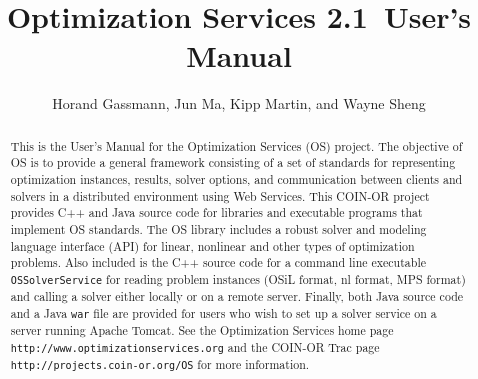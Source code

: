 \documentclass[11pt]{article}
\renewcommand{\_}{{\char"5F}}
\renewcommand{\{}{{\char"7B}}
\renewcommand{\}}{{\char"7D}}
\renewcommand{\^}{{\char"0D}}
\renewcommand{\'}{{\char"0D}}
\newcommand{\UrlOs}{http://www.optimizationservices.org}
\newcommand{\UrlTrac}{http://projects.coin-or.org/OS}
\newcommand{\OSstable}{2.1}
\begin{document}

\title{Optimization Services \OSstable\ User's Manual }
\vskip 2in
\author{Horand Gassmann, Jun Ma,  Kipp Martin, and Wayne Sheng}
\maketitle

\begin{abstract}
This is the User's Manual for the Optimization Services (OS) project.  The objective of OS is to provide a
general framework consisting of a set of standards for representing optimization instances, results,
solver options, and communication between clients and solvers in a distributed environment using Web Services.
This COIN-OR project provides C++ and Java source code for libraries and executable programs that 
implement OS standards.   The OS library includes a robust solver and modeling language interface (API) for linear,
nonlinear and other types of optimization problems.   Also included is the C++ source code for a  command line
executable {\tt OSSolverService}  for reading problem instances 
(OSiL format, nl format, MPS format) and
calling a solver either locally or on a remote server.  Finally,  both Java source code and a Java {\tt war} 
file are provided for users who wish to set up a solver service on a server running Apache Tomcat.
See the Optimization Services home page {\tt\UrlOs} and the COIN-OR Trac page {\tt\UrlTrac} for 
more information.
\end{abstract}
\end{document}
